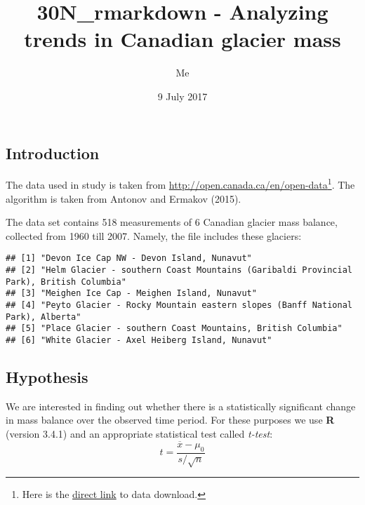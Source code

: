 \documentclass[]{article}
\title{30N\_rmarkdown - Analyzing trends in Canadian glacier mass}
\author{Me}
\date{9 July 2017}
\newenvironment{Shaded}{\begin{snugshade}}{\end{snugshade}}
\newcommand{\KeywordTok}[1]{\textcolor[rgb]{0.13,0.29,0.53}{\textbf{{#1}}}}
\newcommand{\NormalTok}[1]{{#1}}
\let\rmarkdownfootnote\footnote%
\def\footnote{\protect\rmarkdownfootnote}
\begin{document}
\maketitle

{
\hypersetup{linkcolor=black}
\setcounter{tocdepth}{2}
\tableofcontents
}
\subsection{Introduction}\label{introduction}

The data used in study is taken from
\url{http://open.canada.ca/en/open-data}\footnote{Here is the
  \href{https://raw.githubusercontent.com/tonytonov/Rcourse/master/R\%20markdown/demos/glacier.csv}{direct
  link} to data download.}. The algorithm is taken from Antonov and
Ermakov (2015).

The data set contains 518 measurements of 6 Canadian glacier mass
balance, collected from 1960 till 2007. Namely, the file includes these
glaciers:

\begin{Shaded}
\end{Shaded}

\begin{verbatim}
## [1] "Devon Ice Cap NW - Devon Island, Nunavut"                                             
## [2] "Helm Glacier - southern Coast Mountains (Garibaldi Provincial Park), British Columbia"
## [3] "Meighen Ice Cap - Meighen Island, Nunavut"                                            
## [4] "Peyto Glacier - Rocky Mountain eastern slopes (Banff National Park), Alberta"         
## [5] "Place Glacier - southern Coast Mountains, British Columbia"                           
## [6] "White Glacier - Axel Heiberg Island, Nunavut"
\end{verbatim}

\subsection{Hypothesis}\label{hypothesis}

We are interested in finding out whether there is a statistically
significant change in mass balance over the observed time period. For
these purposes we use \textbf{R} (version 3.4.1) and an appropriate
statistical test called \emph{t-test}:
\[t = \frac{\overline{x} - \mu_0}{s/\sqrt{n}} \]
\end{document}
